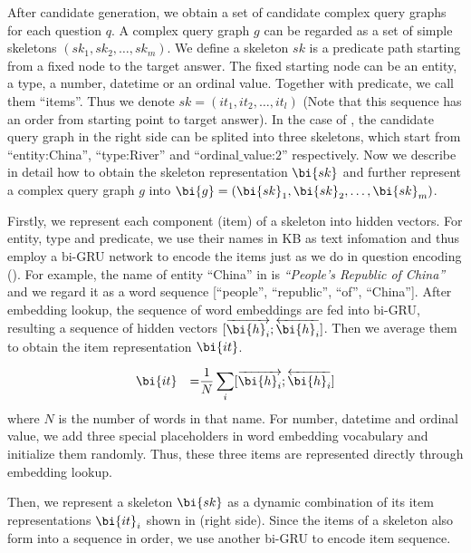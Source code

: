 After candidate generation, we obtain a set of candidate complex query graphs for each question $q$. A complex query graph $g$ can be regarded as a set of simple skeletons $(sk_1, sk_2, \dots, sk_m)$. We define a skeleton $sk$ is a predicate path starting from a fixed node to the target answer. The fixed starting node can be an entity, a type, a number, datetime or an ordinal value. Together with predicate, we call them ``items''. Thus we denote $sk = (it_1, it_2, \dots, it_l)$ (Note that this sequence has an order from starting point to target answer). In the case of , the candidate query graph in the right side can be splited into three skeletons, which start from ``entity:China'', ``type:River'' and ``ordinal$\_$value:$2$'' respectively. 
Now we describe in detail how to obtain the skeleton representation $\bi{sk}$ and further represent a complex query graph $g$ into $\bi{g} = (\bi{sk}_1, \bi{sk}_2, \dots, \bi{sk}_m)$. 

Firstly, we represent each component (item) of a skeleton into hidden vectors. For entity, type and predicate, we use their names in KB as text infomation and thus employ a bi-GRU network to encode the items just as we do in question encoding (). For example, the name of entity ``China'' in  is \textit{``People's Republic of China''} and we regard it as a word sequence [``people'', ``republic'', ``of'', ``China'']. After embedding lookup, the sequence of word embeddings are fed into bi-GRU, resulting a sequence of hidden vectors $[\overrightarrow{\bi{h}_i};\overleftarrow{\bi{h}_i}]$. Then we average them to obtain the item representation $\bi{it}$.

\begin{equation}
\label{eqn:item}
\begin{aligned}
& \bi{it} & = & \frac{1}{N}\sum_{i}[\overrightarrow{\bi{h}_i};\overleftarrow{\bi{h}_i}]\\
\end{aligned}
\end{equation}
\noindent
where $N$ is the number of words in that name.
For number, datetime and ordinal value, we add three special placeholders in word embedding vocabulary and initialize them randomly. Thus, these three items are represented directly through embedding lookup. 


Then, we represent a skeleton $\bi{sk}$ as a dynamic combination of its item representations $\bi{it}_i$ shown in  (right side). Since the items of a skeleton also form into a sequence in order, we use another bi-GRU to encode item sequence.

